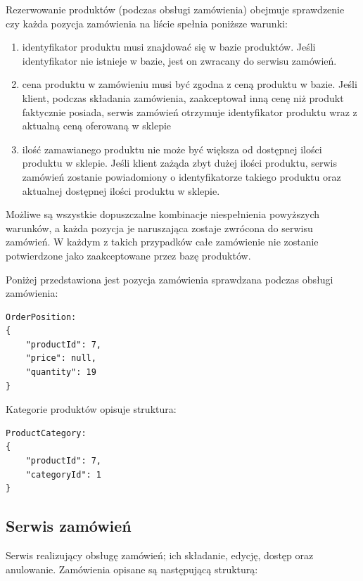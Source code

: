 \documentclass[11pt,a4paper,twoside]{article}
\begin{document}
Rezerwowanie produktów (podczas obsługi zamówienia) obejmuje sprawdzenie czy każda pozycja zamówienia na liście spełnia poniższe warunki:
\begin{enumerate}
\item identyfikator produktu musi znajdować się w bazie produktów. Jeśli identyfikator nie istnieje w bazie, jest on zwracany do serwisu zamówień.
\item cena produktu w zamówieniu musi być zgodna z ceną produktu w bazie. Jeśli klient, podczas składania zamówienia, zaakceptował inną cenę niż produkt faktycznie posiada, serwis zamówień otrzymuje identyfikator produktu wraz z aktualną ceną oferowaną w sklepie
\item ilość zamawianego produktu nie może być większa od dostępnej ilości produktu w sklepie. Jeśli klient zażąda zbyt dużej ilości produktu, serwis zamówień zostanie powiadomiony o identyfikatorze takiego produktu oraz aktualnej dostępnej ilości produktu w sklepie.
\end{enumerate}

Możliwe są wszystkie dopuszczalne kombinacje niespełnienia powyższych warunków, a każda pozycja je naruszająca zostaje zwrócona do serwisu zamówień. W każdym z takich przypadków całe zamówienie nie zostanie potwierdzone jako zaakceptowane przez bazę produktów. 

Poniżej przedstawiona jest pozycja zamówienia sprawdzana podczas obsługi zamówienia:

\begin{lstlisting}
OrderPosition:
{
	"productId": 7,
    "price": null,
    "quantity": 19
}
\end{lstlisting}
\vspace{-20pt}

Kategorie produktów opisuje struktura:
\begin{lstlisting}
ProductCategory:
{
	"productId": 7,
    "categoryId": 1
}
\end{lstlisting}
\vspace{-20pt}


\newpage
\subsection{Serwis zamówień}
Serwis realizujący obsługę zamówień; ich składanie, edycję, dostęp oraz anulowanie. Zamówienia opisane są następującą strukturą:
\end{document}
